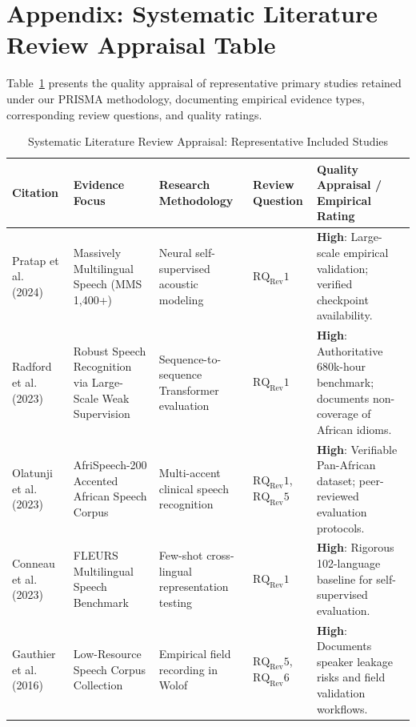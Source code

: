 \documentclass[a4paper,11pt]{article}
\begin{document}
\appendix

\section*{Appendix: Systematic Literature Review Appraisal Table}

Table~\ref{tab:slr_appraisal} presents the quality appraisal of representative primary studies retained under our PRISMA methodology, documenting empirical evidence types, corresponding review questions, and quality ratings.

\begin{table}[ht]
\centering
\small
\setlength{\tabcolsep}{4.5pt}
\caption{Systematic Literature Review Appraisal: Representative Included Studies}
\label{tab:slr_appraisal}
\begin{tabular}{p{2.8cm} p{3.6cm} p{3.0cm} p{1.6cm} >{\raggedright\arraybackslash}p{5.4cm}}
\toprule
\textbf{Citation} & \textbf{Evidence Focus} & \textbf{Research Methodology} & \textbf{Review Question} & \textbf{Quality Appraisal / Empirical Rating} \\
\midrule
Pratap et al. (2024)~\cite{pratap2024scaling} & Massively Multilingual Speech (MMS 1,400+) & Neural self-supervised acoustic modeling & $\text{RQ}_{\text{Rev}}1$ & \textbf{High}: Large-scale empirical validation; verified checkpoint availability. \\
\addlinespace
Radford et al. (2023)~\cite{radford2023robust} & Robust Speech Recognition via Large-Scale Weak Supervision & Sequence-to-sequence Transformer evaluation & $\text{RQ}_{\text{Rev}}1$ & \textbf{High}: Authoritative 680k-hour benchmark; documents non-coverage of African idioms. \\
\addlinespace
Olatunji et al. (2023)~\cite{olatunji2023afrispeech} & AfriSpeech-200 Accented African Speech Corpus & Multi-accent clinical speech recognition & $\text{RQ}_{\text{Rev}}1$, $\text{RQ}_{\text{Rev}}5$ & \textbf{High}: Verifiable Pan-African dataset; peer-reviewed evaluation protocols. \\
\addlinespace
Conneau et al. (2023)~\cite{conneau2023fleurs} & FLEURS Multilingual Speech Benchmark & Few-shot cross-lingual representation testing & $\text{RQ}_{\text{Rev}}1$ & \textbf{High}: Rigorous 102-language baseline for self-supervised evaluation. \\
\addlinespace
Gauthier et al. (2016)~\cite{gauthier2016collecting} & Low-Resource Speech Corpus Collection & Empirical field recording in Wolof & $\text{RQ}_{\text{Rev}}5$, $\text{RQ}_{\text{Rev}}6$ & \textbf{High}: Documents speaker leakage risks and field validation workflows. \\

\end{tabular}
\end{table}
\end{document}
